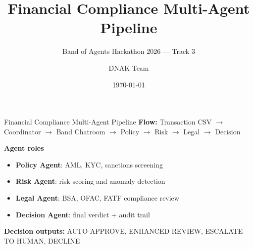 \documentclass{beamer}
\title{Financial Compliance Multi-Agent Pipeline}
\subtitle{Band of Agents Hackathon 2026 --- Track 3}
\author{DNAK Team}
\date{\today}
\begin{document}
\begin{frame}{Financial Compliance Multi-Agent Pipeline}
\textbf{Flow:} Transaction CSV $\rightarrow$ Coordinator $\rightarrow$ Band Chatroom $\rightarrow$ Policy $\rightarrow$ Risk $\rightarrow$ Legal $\rightarrow$ Decision

\vspace{0.6em}
\textbf{Agent roles}
\begin{itemize}
    \item \textbf{Policy Agent}: AML, KYC, sanctions screening
    \item \textbf{Risk Agent}: risk scoring and anomaly detection
    \item \textbf{Legal Agent}: BSA, OFAC, FATF compliance review
    \item \textbf{Decision Agent}: final verdict + audit trail
\end{itemize}

\vspace{0.4em}
\textbf{Decision outputs:} AUTO-APPROVE, ENHANCED REVIEW, ESCALATE TO HUMAN, DECLINE
\end{frame}
\end{document}
